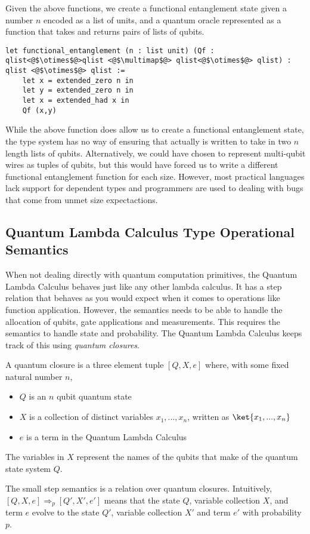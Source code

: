 Given the  above functions, we create a functional entanglement state given a number $n$ encoded as a list of units, and a quantum oracle represented as a function that takes and returns pairs of lists of qubits.
\begin{lstlisting}[style=customcoq]
let functional_entanglement (n : list unit) (Qf : qlist<@$\otimes$@>qlist <@$\multimap$@> qlist<@$\otimes$@> qlist) : qlist <@$\otimes$@> qlist :=
    let x = extended_zero n in
    let y = extended_zero n in 
    let x = extended_had x in
    Qf (x,y)
\end{lstlisting}
While the above function does allow us to create a functional entanglement state, the type system has no way of ensuring that  actually is written to take in two $n$ length lists of qubits.
Alternatively, we could have chosen to represent multi-qubit wires as tuples of qubits, but this would have forced us to write a different functional entanglement function for each size.
However, most practical languages lack support for dependent types and programmers are used to dealing with bugs that come from unmet size expectactions.


\subsection{Quantum Lambda Calculus Type Operational Semantics}

When not dealing directly with quantum computation primitives, the Quantum Lambda Calculus behaves just like any other lambda calculus.
It has a step relation that behaves as you would expect when it comes to operations like function application.
However, the semantics needs to be able to handle the allocation of qubits, gate applications and measurements. 
This requires the semantics to handle state and probability.
The Quantum Lambda Calculus keeps track of this using \textit{quantum closures}.
\begin{definition}
    A quantum closure is a three element tuple $[Q,X,e]$ where, with some fixed natural number $n$,
    \begin{itemize}
        \item $Q$ is an $n$ qubit quantum state
        \item $X$ is a collection of distinct variables $x_1,..., x_n$, written as $\ket{x_1,..., x_n}$
        \item $e$ is a term in the Quantum Lambda Calculus
    \end{itemize}
    The variables in $X$ represent the names of the qubits that make of the quantum state system $Q$.
\end{definition}
The small step semantics is a relation over quantum closures. 
Intuitively, $[Q,X,e] \Rightarrow_{p} [Q',X',e']$ means that the state $Q$, variable collection $X$, and term $e$ evolve to the state $Q'$, variable collection $X'$ and term $e'$ with probability $p$.

